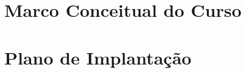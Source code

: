 \documentclass[11pt,a4paper]{report}
\begin{document}
\chapter{Marco Conceitual do Curso}\label{cha:MarcoConceitual}



%


\chapter{Plano de Implantação}~\label{cha:implantacao}





\clearpage
% 
% 
\printbibliography[heading = bibintoc, title = {Referências Bibliográficas}]



%
%
%
%
%
%
%
%
%
%
%
\end{document}
